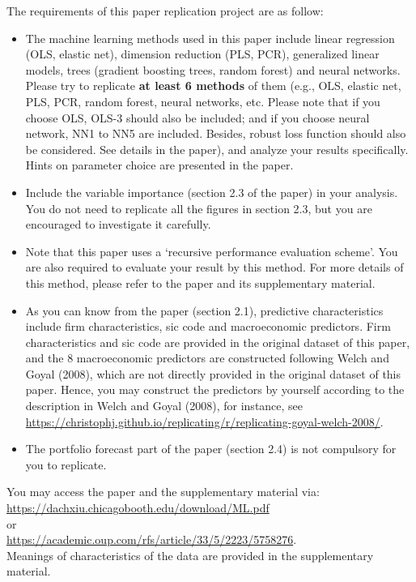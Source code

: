 \documentclass[11pt]{article}
\begin{document}
The requirements of this paper replication project are as follow:
\begin{itemize}
\item The machine learning methods used in this paper include linear regression (OLS, elastic net), dimension reduction (PLS, PCR), generalized linear models, trees (gradient boosting trees, random forest) and neural networks. Please try to replicate \textbf{at least 6 methods} of them (e.g., OLS, elastic net, PLS, PCR, random forest, neural networks, etc. Please note that if you choose OLS, OLS-3 should also be included; and if you choose neural network, NN1 to NN5 are included. Besides, robust loss function should also be considered. See details in the paper), and analyze your results specifically. Hints on parameter choice are presented in the paper.
\item Include the variable importance (section 2.3 of the paper) in your analysis. You do not need to replicate all the figures in section 2.3, but you are encouraged to investigate it carefully.
\item Note that this paper uses a `recursive performance evaluation scheme'. You are also required to evaluate your result by this method. For more details of this method, please refer to the paper and its supplementary material. %
\item As you can know from the paper (section 2.1), predictive characteristics include firm characteristics, sic code and macroeconomic predictors. Firm characteristics and sic code are provided in the original dataset of this paper, and the 8 macroeconomic predictors are constructed following Welch and Goyal (2008), which are not directly provided in the original dataset of this paper. Hence, you may construct the predictors by yourself according to the description in Welch and Goyal (2008), for instance, see \\
\url{https://christophj.github.io/replicating/r/replicating-goyal-welch-2008/}.
\item The portfolio forecast part of the paper (section 2.4) is not compulsory for you to replicate.
\end{itemize}

You may access the paper and the supplementary material via: \\
\url{https://dachxiu.chicagobooth.edu/download/ML.pdf} \\
or \\
\url{https://academic.oup.com/rfs/article/33/5/2223/5758276}.  \\
Meanings of characteristics of the data are provided in the supplementary material.
\end{document}
